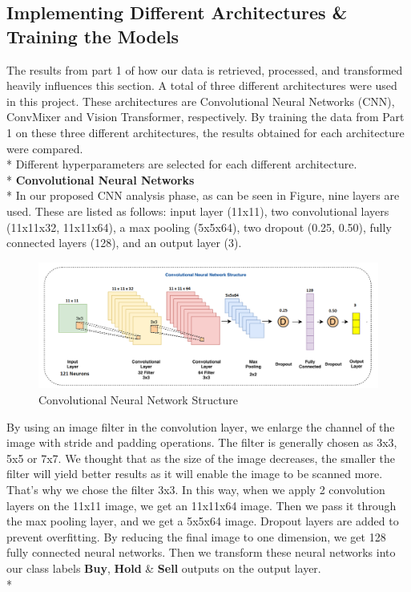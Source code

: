 \documentclass{article}
\begin{document}
\subsection{Implementing Different Architectures \& Training the Models}
The results from part 1 of how our data is retrieved, processed, and transformed heavily influences this section. A total of three different architectures were used in this project. These architectures are Convolutional Neural Networks (CNN), ConvMixer and Vision Transformer, respectively. By training the data from Part 1 on these three different architectures, the results obtained for each architecture were compared.\vspace{0.1cm} \\*
Different hyperparameters are selected for each different architecture.\vspace{0.3cm} \\*
\textbf{\large Convolutional Neural Networks} \\*
In our proposed CNN analysis phase, as can be seen in Figure, nine layers are used. These are listed as follows: input layer (11x11), two convolutional layers (11x11x32, 11x11x64), a max pooling (5x5x64), two dropout (0.25, 0.50), fully connected layers (128), and an output layer (3).
\begin{figure}[H]
\begin{center}
   \includegraphics[scale=0.24]{assets/structures/cnn.png}
   \caption{Convolutional Neural Network Structure}
\end{center}
\end{figure}
\noindent
By using an image filter in the convolution layer, we enlarge the channel of the image with stride and padding operations. The filter is generally chosen as 3x3, 5x5 or 7x7. We thought that as the size of the image decreases, the smaller the filter will yield better results as it will enable the image to be scanned more. That's why we chose the filter 3x3. In this way, when we apply 2 convolution layers on the 11x11 image, we get an 11x11x64 image. Then we pass it through the max pooling layer, and we get a 5x5x64 image. Dropout layers are added to prevent overfitting. By reducing the final image to one dimension, we get 128 fully connected neural networks. Then we transform these neural networks into our class labels \textbf{Buy}, \textbf{Hold} \& \textbf{Sell} outputs on the output layer.\vspace{0.1cm} \\*
\end{document}
